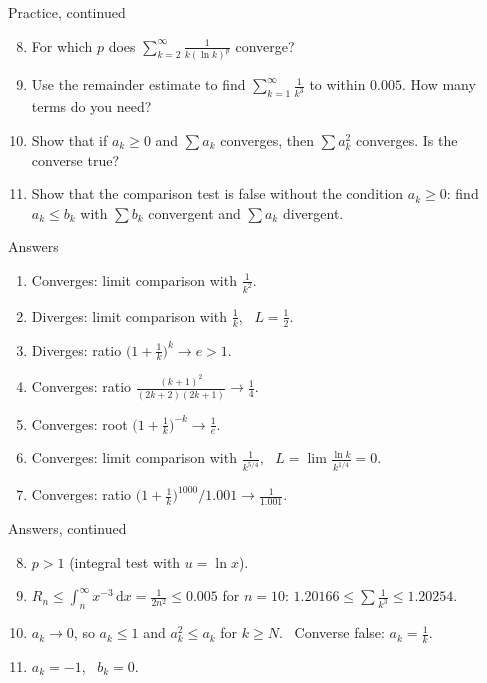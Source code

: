 \documentclass[10pt]{wosm-slides}
\newcommand{\dx}{\,\mathrm{d}x}
\begin{document}
\begin{frame}{Practice, continued}
  \small
  \begin{enumerate}
    \setcounter{enumi}{7}
    \item For which $p$ does $\displaystyle\sum_{k=2}^\infty \frac{1}{k (\ln k)^p}$ converge?
    \item Use the remainder estimate to find $\sum_{k=1}^\infty \frac{1}{k^3}$ to within $0.005$.
      How many terms do you need?
    \item Show that if $a_k \ge 0$ and $\sum a_k$ converges, then $\sum a_k^2$ converges.
      Is the converse true?
    \item Show that the comparison test is false without the condition $a_k \ge 0$:
      find $a_k \le b_k$ with $\sum b_k$ convergent and $\sum a_k$ divergent.
  \end{enumerate}
\end{frame}

\begin{frame}{Answers}
  \small
  \begin{enumerate}
    \item Converges: limit comparison with $\frac1{k^2}$.
    \item Diverges: limit comparison with $\frac1k$, \ $L = \frac12$.
    \item Diverges: ratio $\bigl(1 + \frac1k\bigr)^k \to e > 1$.
    \item Converges: ratio $\frac{(k+1)^2}{(2k+2)(2k+1)} \to \frac14$.
    \item Converges: root $\bigl(1 + \frac1k\bigr)^{-k} \to \frac1e$.
    \item Converges: limit comparison with $\frac{1}{k^{5/4}}$, \
      $L = \lim \frac{\ln k}{k^{1/4}} = 0$.
    \item Converges: ratio $\bigl(1 + \frac1k\bigr)^{1000} / 1.001 \to \frac{1}{1.001}$.
  \end{enumerate}
\end{frame}

\begin{frame}{Answers, continued}
  \small
  \begin{enumerate}
    \setcounter{enumi}{7}
    \item $p > 1$ (integral test with $u = \ln x$).
    \item $R_n \le \int_n^\infty x^{-3}\dx = \frac{1}{2n^2} \le 0.005$ for $n = 10$:
      $1.20166 \le \sum \frac1{k^3} \le 1.20254$.
    \item $a_k \to 0$, so $a_k \le 1$ and $a_k^2 \le a_k$ for $k \ge N$. \
      Converse false: $a_k = \frac1k$.
    \item $a_k = -1$, \ $b_k = 0$.
  \end{enumerate}
\end{frame}
\end{document}
